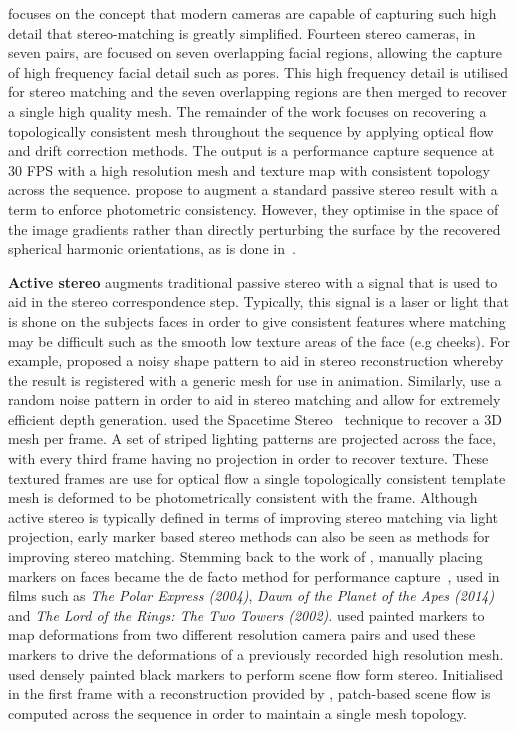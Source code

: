 focuses on the concept that modern cameras are capable of capturing such high
detail that stereo-matching is greatly simplified. Fourteen stereo cameras, in
seven pairs, are focused on seven overlapping facial regions, allowing the
capture of high frequency facial detail such as pores. This high frequency
detail is utilised for stereo matching and the seven overlapping regions are
then merged to recover a single high quality mesh. The remainder of the work
focuses on recovering a topologically consistent mesh throughout the sequence by
applying optical flow and drift correction methods. The output is a performance
capture sequence at 30 FPS with a high resolution mesh and texture map
with consistent topology across the sequence.
\citet{wu2011high} propose to augment a standard passive stereo result with
a term to enforce photometric consistency. However, they optimise in the space
of the image gradients rather than directly perturbing the surface by the
recovered spherical harmonic orientations, as is done
in~\cite{nehab2005efficiently}.

\textbf{Active stereo} augments traditional passive stereo with a signal that is
used to aid in the stereo correspondence step. Typically, this signal is a laser
or light that is shone on the subjects faces in order to give consistent
features where matching may be difficult such as the smooth low texture areas of
the face (e.g cheeks). For example, \citet{enciso1999synthesis} proposed a noisy
shape pattern to aid in stereo reconstruction whereby the result is registered
with a generic mesh for use in animation. Similarly, \citet{d2002modeling}
use a random noise pattern in order to aid in stereo matching and allow
for extremely efficient depth generation.
\citet{zhang2004spacetime} used the
Spacetime Stereo~\cite{zhang2003spacetime,davis2005spacetime} technique to
recover a 3D mesh per frame. A set of striped lighting patterns are projected
across the face, with every third frame having no projection in order to recover
texture. These textured frames are use for optical flow a single topologically
consistent template mesh is deformed to be photometrically consistent with the
frame.
Although active stereo is typically defined in terms of improving stereo
matching via light projection, early marker based stereo methods can also be
seen as methods for improving stereo matching.
Stemming back to the work of \citet{williams1990performance}, manually placing
markers on faces became the de facto method for performance
capture~\cite{bickel2007multi,furukawa2009dense,bredow2005mocap},
used in films such as \textit{The Polar Express (2004)},
\textit{Dawn of the Planet of the Apes (2014)} and
\textit{The Lord of the Rings: The Two Towers (2002)}.
\citet{bickel2007multi} used painted markers to map deformations from two
different resolution camera pairs and used these markers to drive the
deformations of a previously recorded high resolution mesh.
\citet{furukawa2009dense} used densely painted black markers to perform
scene flow form stereo. Initialised in the first frame with a reconstruction
provided by \citet{Furu:2010:PMVS}, patch-based scene flow is computed across
the sequence in order to maintain a single mesh topology.

